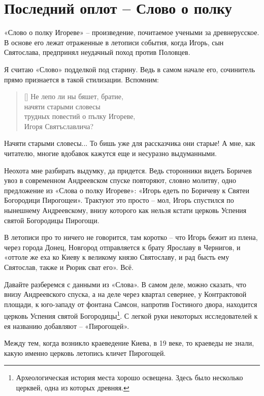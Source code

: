 \chapter{Последний оплот – Слово о полку}

«Слово о полку Игореве» – произведение, почитаемое учеными за древнерусское. В основе его лежат отраженные в летописи события, когда Игорь, сын Святослава, предпринял неудачный поход против Половцев.

Я считаю «Слово» подделкой под старину. Ведь в самом начале его, сочинитель прямо признается в такой стилизации. Вспомним:

\settowidth{\versewidth}{трудных повестий о пълку Игореве,} 
\begin{verse}[\versewidth]
Не лепо ли ны бяшет, братие,\\
начяти старыми словесы\\
трудных повестий о пълку Игореве,\\
Игоря Святъславлича?
\end{verse}

Начяти старыми словесы... То бишь уже для рассказчика они старые! А мне, как читателю, многие вдобавок кажутся еще и несуразно выдуманными.

Неохота мне разбирать выдумку, да придется. Ведь сторонники видеть Боричев увоз в современном Андреевском спуске повторяют, словно молитву, одно предложение из «Слова о полку Игореве»: «Игорь едеть по Боричеву к Святеи Богородици Пирогощеи». Трактуют это просто – мол, Игорь спустился по нынешнему Андреевскому, внизу которого как нельзя кстати церковь Успения святой Богородицы Пирогощи.

В летописи про то ничего не говорится, там коротко – что Игорь бежит из плена, через города Донец, Новгород отправляется к брату Ярославу в Чернигов, и «оттоле же еха ко Киеву к великому князю Святославу, и рад бысть ему Святослав, также и Рюрик сват его». Всё.

Давайте разберемся с данными из «Слова». В самом деле, можно сказать, что внизу Андреевского спуска, а на деле через квартал севернее, у Контрактовой площади, к юго-западу от фонтана Самсон, напротив Гостиного двора, находится церковь Успения святой Богородицы\footnote{Археологическая история места хорошо освещена. Здесь было несколько церквей, одна из которых древняя.}. С легкой руки некоторых исследователей к ея названию добавляют – «Пирогощей».

Между тем, когда возникло краеведение Киева, в 19 веке, то краеведы не знали, какую именно церковь летопись кличет Пирогощей.

